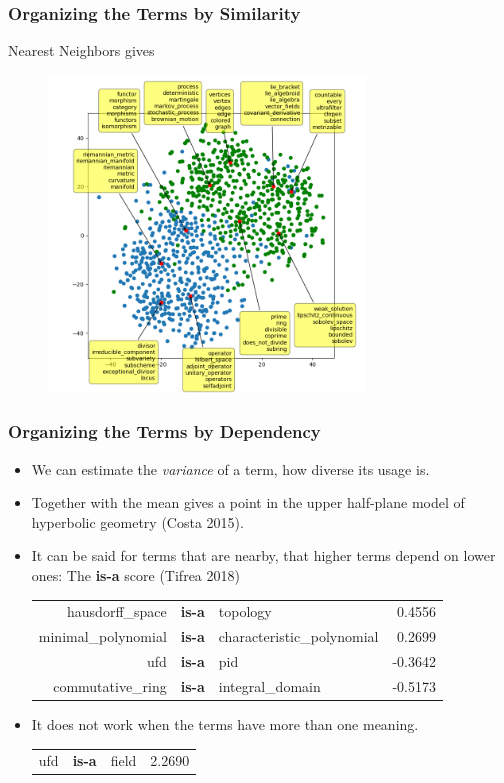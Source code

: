 \documentclass[10pt]{beamer}
\begin{document}
\begin{frame}
    \frametitle{Organizing the Terms by Similarity}
    Nearest Neighbors gives 
            \begin{figure}
                \centering
                \includegraphics[width=0.75\textwidth]{../Images/showcenters.png}
            \end{figure}
\end{frame}

\begin{frame}
    \frametitle{Organizing the Terms by Dependency}
    \begin{itemize}
        \item We can estimate the \textit{variance} of a term, how diverse its usage is. \pause
        \item Together with the mean gives a point in the upper half-plane model of hyperbolic geometry (Costa 2015).
            \pause
        \item It can be said for terms that are nearby, that higher terms depend on lower ones: The \textbf{is-a} score (Tifrea 2018)
            \pause
            \begin{tabular}{rclr}
                \centering
hausdorff\_space & \textbf{is-a}  &   topology  &  0.4556 \\
minimal\_polynomial & \textbf{is-a} & characteristic\_polynomial  &  0.2699 \\
ufd   & \textbf{is-a}   &      pid &  -0.3642 \\
commutative\_ring & \textbf{is-a} & integral\_domain  & -0.5173 \\
\end{tabular}
\pause
\item It does not work when the terms have more than one meaning.
            \begin{tabular}{rclr}
                \centering
ufd  & \textbf{is-a}  & field  & 2.2690 \\
\end{tabular}
    \end{itemize}
\end{frame}
\end{document}
